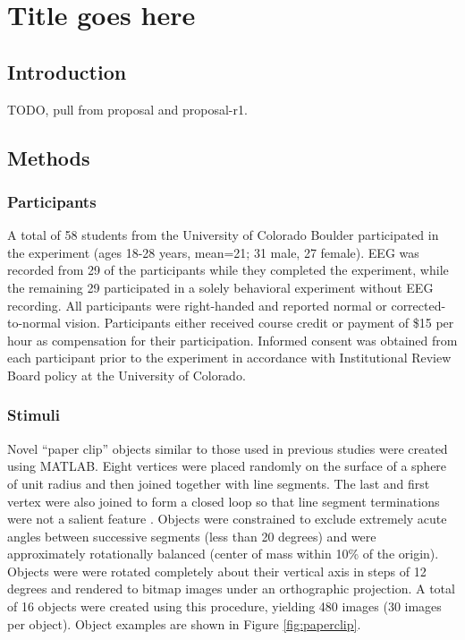 \documentclass[dwyatte_dissertation.tex]{subfiles}
\begin{document}
\chapter{Title goes here} %

\section{Introduction}
TODO, pull from proposal and proposal-r1.

\section{Methods}

\subsection{Participants}

A total of 58 students from the University of Colorado Boulder participated in the experiment (ages 18-28 years, mean=21; 31 male, 27 female). EEG was recorded from 29 of the participants while they completed the experiment, while the remaining 29 participated in a solely behavioral experiment without EEG recording. All participants were right-handed and reported normal or corrected-to-normal vision. Participants either received course credit or payment of \$15 per hour as compensation for their participation. Informed consent was obtained from each participant prior to the experiment in accordance with Institutional Review Board policy at the University of Colorado.

\subsection{Stimuli}
Novel ``paper clip'' objects similar to those used in previous studies \cite{BulthoffEdelman92,EdelmanBulthoff92,LogothetisPaulsBulthoffEtAl94,LogothetisPaulsPoggio95,SinhaPoggio96} were created using MATLAB. Eight vertices were placed randomly on the surface of a sphere of unit radius and then joined together with line segments. The last and first vertex were also joined to form a closed loop so that line segment terminations were not a salient feature \cite{BalasSinha09b}. Objects were constrained to exclude extremely acute angles between successive segments (less than 20 degrees) and were approximately rotationally balanced (center of mass within 10\% of the origin). Objects were were rotated completely about their vertical axis in steps of 12 degrees and rendered to bitmap images under an orthographic projection. A total of 16 objects were created using this procedure, yielding 480 images (30 images per object). Object examples are shown in Figure \ref{fig:paperclip}.
\end{document}
